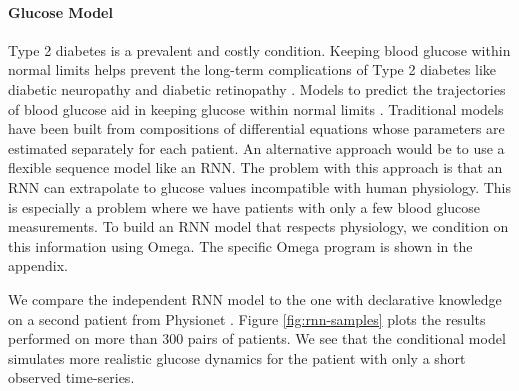 \paragraph{Glucose Model}
Type 2 diabetes is a prevalent and costly condition.
Keeping blood glucose within normal limits helps prevent the
long-term complications of Type 2 diabetes like diabetic neuropathy and diabetic retinopathy \citep{brownlee2006glycemic}. Models to predict the trajectories of blood glucose aid in keeping glucose within
normal limits \citep{zeevi2015personalized}. Traditional models have been built from compositions of differential equations \citep{albers2017personalized,levine2017offline} whose parameters are estimated separately for each patient. An alternative approach would be to use a flexible sequence model like an RNN. The problem with this approach is that an RNN can extrapolate to glucose values incompatible with human physiology. This is especially a problem where we have patients with only a few blood glucose measurements. To build an RNN model that respects physiology, we condition on this information using Omega. The specific Omega program is shown in the appendix.

We compare the independent RNN model to the one with declarative knowledge on a second patient from Physionet \citep{moody2001physionet}.
Figure \ref{fig:rnn-samples} plots the results performed on more than 300 pairs of patients.
We see that the conditional model simulates
more realistic glucose dynamics for the patient 
with only a short observed time-series.




